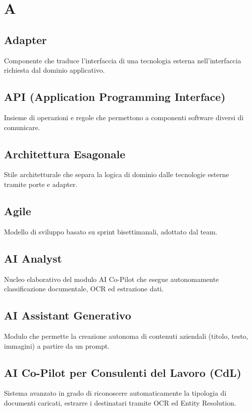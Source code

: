 \documentclass[a4paper,12pt]{article}
\begin{document}
\newpage
{}
\setcounter{page}{1}
\newpage

\tableofcontents

\newpage


\section{A}

\subsection{Adapter}
Componente che traduce l'interfaccia di una tecnologia esterna nell'interfaccia richiesta dal dominio applicativo.

\subsection{API (Application Programming Interface)}
Insieme di operazioni e regole che permettono a componenti software diversi di comunicare.

\subsection{Architettura Esagonale}
Stile architetturale che separa la logica di dominio dalle tecnologie esterne tramite porte e adapter.

\subsection{Agile}
Modello di sviluppo basato su sprint bisettimanali, adottato dal team.

\subsection{AI Analyst}
Nucleo elaborativo del modulo AI Co-Pilot che esegue autonomamente classificazione documentale, OCR ed estrazione dati.

\subsection{AI Assistant Generativo}
Modulo che permette la creazione autonoma di contenuti aziendali (titolo, testo, immagini) a partire da un prompt.

\subsection{AI Co-Pilot per Consulenti del Lavoro (CdL)}
Sistema avanzato in grado di riconoscere automaticamente la tipologia di documenti caricati, estrarre i destinatari tramite OCR ed Entity Resolution.
\end{document}
